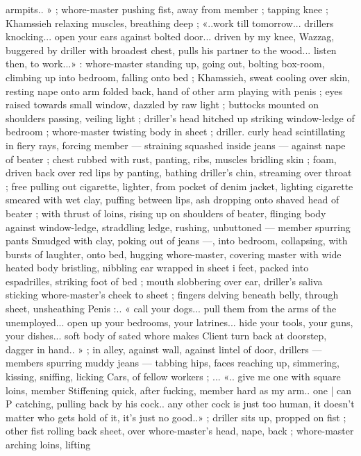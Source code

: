 armpits.. » ; whore-master pushing fist, away from member ; tapping
knee ; Khamssieh relaxing muscles, breathing deep ; «..work till
tomorrow... drillers knocking... open your ears against bolted door...
driven by my knee, Wazzag, buggered by driller with broadest chest,
pulls his partner to the wood... listen then, to work...» : whore-master
standing up, going out, bolting box-room, climbing up into bedroom,
falling onto bed ; Khamssieh, sweat cooling over skin, resting nape
onto arm folded back, hand of other arm playing with penis ; eyes
raised towards small window, dazzled by raw light ; buttocks mounted
on shoulders passing, veiling light ; driller's head hitched up striking
window-ledge of bedroom ; whore-master twisting body in sheet ;
driller. curly head scintillating in fiery rays, forcing member ---
straining squashed inside jeans --- against nape of beater ; chest
rubbed with rust, panting, ribs, muscles bridling skin ; foam, driven
back over red lips by panting, bathing driller's chin, streaming over
throat ; free pulling out cigarette, lighter, from pocket of denim
jacket, lighting cigarette smeared with wet clay, puffing between lips,
ash dropping onto shaved head of beater ; with thrust of loins, rising
up on shoulders of beater, flinging body against window-ledge,
straddling ledge, rushing, unbuttoned --- member spurring pants
Smudged with clay, poking out of jeans ---, into bedroom, collapsing,
with bursts of laughter, onto bed, hugging whore-master, covering
master with wide heated body bristling, nibbling ear wrapped in sheet
i feet, packed into espadrilles, striking foot of bed ; mouth
slobbering over ear, driller's saliva sticking whore-master's cheek to
sheet ; fingers delving beneath belly, through sheet, unsheathing
Penis :.. « call your dogs... pull them from the arms of the
unemployed... open up your bedrooms, your latrines... hide your
tools, your guns, your dishes... soft body of sated whore makes
Client turn back at doorstep, dagger in hand.. » ; in alley, against wall,
against lintel of door, drillers --- members spurring muddy jeans ---
tabbing hips, faces reaching up, simmering, kissing, sniffing, licking
Cars, of fellow workers ; ... «.. give me one with square loins, member
Stiffening quick, after fucking, member hard as my arm.. one | can
P catching, pulling back by his cock.. any other cock is just too
human, it doesn’t matter who gets hold of it, it's just no good..» ;
driller sits up, propped on fist ; other fist rolling back sheet, over
whore-master’s head, nape, back ; whore-master arching loins, lifting
